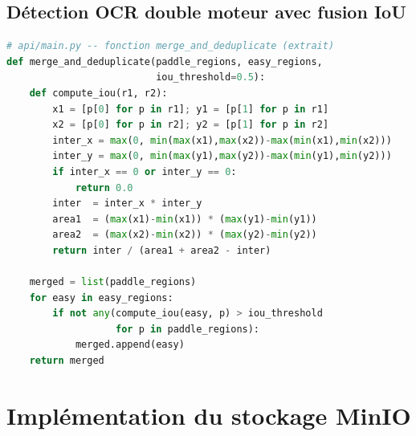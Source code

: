 \subsection{Détection OCR double moteur avec fusion IoU}

\begin{lstlisting}[language=Python, caption={Fusion des résultats PaddleOCR et EasyOCR par IoU}, label={lst:iou_fusion}]
# api/main.py -- fonction merge_and_deduplicate (extrait)
def merge_and_deduplicate(paddle_regions, easy_regions,
                          iou_threshold=0.5):
    def compute_iou(r1, r2):
        x1 = [p[0] for p in r1]; y1 = [p[1] for p in r1]
        x2 = [p[0] for p in r2]; y2 = [p[1] for p in r2]
        inter_x = max(0, min(max(x1),max(x2))-max(min(x1),min(x2)))
        inter_y = max(0, min(max(y1),max(y2))-max(min(y1),min(y2)))
        if inter_x == 0 or inter_y == 0:
            return 0.0
        inter  = inter_x * inter_y
        area1  = (max(x1)-min(x1)) * (max(y1)-min(y1))
        area2  = (max(x2)-min(x2)) * (max(y2)-min(y2))
        return inter / (area1 + area2 - inter)

    merged = list(paddle_regions)
    for easy in easy_regions:
        if not any(compute_iou(easy, p) > iou_threshold
                   for p in paddle_regions):
            merged.append(easy)
    return merged
\end{lstlisting}

\section{Implémentation du stockage MinIO}

